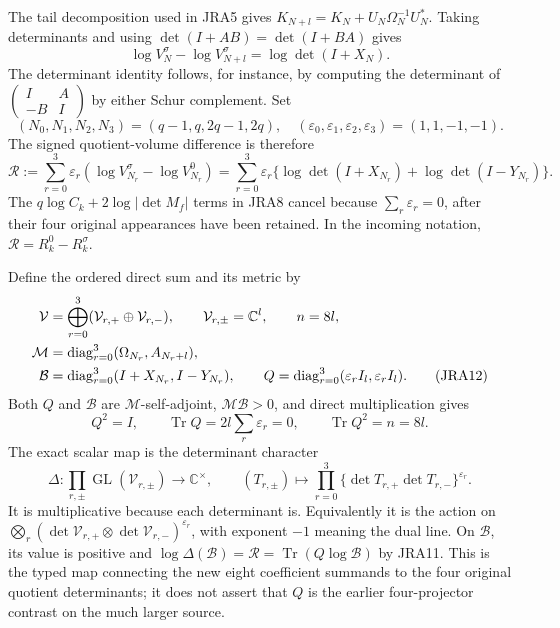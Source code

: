 \documentclass[11pt,a4paper]{article}
\newcommand{\C}{\mathbb C}
\newcommand{\Tr}{\operatorname{Tr}}
\newcommand{\diag}{\operatorname{diag}}
\begin{document}
The tail decomposition used in JRA5 gives
$K_{N+l}=K_N+U_N\Omega_N^{-1}U_N^*$.
Taking determinants and using $\det(I+AB)=\det(I+BA)$ gives
\begin{equation}
 \log V_N^\sigma-\log V_{N+l}^\sigma=\log\det(I+X_N).
 \tag{JRA9}
\end{equation}
The determinant identity follows, for instance, by computing the
determinant of $\left(\begin{smallmatrix}I&A\\-B&I\end{smallmatrix}\right)$
by either Schur complement.
Set
\begin{equation}
 (N_0,N_1,N_2,N_3)=(q-1,q,2q-1,2q),\quad
 (\varepsilon_0,\varepsilon_1,\varepsilon_2,\varepsilon_3)=(1,1,-1,-1).
 \tag{JRA10}
\end{equation}
The signed quotient-volume difference is therefore
\begin{equation}
 \mathcal R:=\sum_{r=0}^3\varepsilon_r
             (\log V_{N_r}^\sigma-\log V_{N_r}^0)
 =\sum_{r=0}^3\varepsilon_r
       \{\log\det(I+X_{N_r})+\log\det(I-Y_{N_r})\}.
 \tag{JRA11}
\end{equation}
The $q\log C_k+2\log|\det M_f|$ terms in JRA8 cancel because
$\sum_r\varepsilon_r=0$, after their four original appearances have
been retained. In the incoming notation, $\mathcal R=R_k^0-R_k^\sigma$.

Define the ordered direct sum and its metric by
\begin{align}
 \mathcal V&=\bigoplus_{r=0}^3
             (\mathcal V_{r,+}\oplus\mathcal V_{r,-}),\qquad
 \mathcal V_{r,\pm}=\C^l,\qquad n=8l,\notag\\
 \mathcal M&=\diag_{r=0}^3(\Omega_{N_r},A_{N_r+l}),\notag\\
 \mathcal B&=\diag_{r=0}^3(I+X_{N_r},I-Y_{N_r}),\qquad
 Q=\diag_{r=0}^3(\varepsilon_r I_l,\varepsilon_r I_l).
 \tag{JRA12}
\end{align}
Both $Q$ and $\mathcal B$ are $\mathcal M$-self-adjoint,
$\mathcal M\mathcal B>0$, and direct multiplication gives
\begin{equation}
 Q^2=I,\qquad \Tr Q=2l\sum_r\varepsilon_r=0,
 \qquad \Tr Q^2=n=8l.\tag{JRA13}
\end{equation}
The exact scalar map is the determinant character
\begin{equation}
 \Delta:\prod_{r,\pm}\operatorname{GL}(\mathcal V_{r,\pm})\to\C^\times,
 \qquad (T_{r,\pm})\longmapsto
       \prod_{r=0}^3\{\det T_{r,+}\det T_{r,-}\}^{\varepsilon_r}.
 \tag{JRA14}
\end{equation}
It is multiplicative because each determinant is. Equivalently it is the
action on $\bigotimes_r(\det\mathcal V_{r,+}\otimes
\det\mathcal V_{r,-})^{\varepsilon_r}$, with exponent $-1$ meaning the
dual line. On $\mathcal B$, its value is positive and
$\log\Delta(\mathcal B)=\mathcal R=\Tr(Q\log\mathcal B)$ by JRA11.
This is the typed map connecting the new eight coefficient summands to
the four original quotient determinants; it does not assert that $Q$
is the earlier four-projector contrast on the much larger source.
\end{document}
